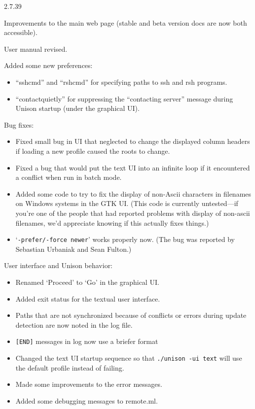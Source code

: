 \begin{changesfromversion}{2.7.39}
\item Improvements to the main web page (stable and beta version docs are
  now both accessible).
\item User manual revised.
\item Added some new preferences:
\begin{itemize}
\item ``sshcmd'' and ``rshcmd'' for specifying paths to ssh and rsh programs.
\item ``contactquietly'' for suppressing the ``contacting server'' message
during Unison startup (under the graphical UI).
\end{itemize}
\item Bug fixes:
\begin{itemize}
\item Fixed small bug in UI that neglected to change the displayed column
  headers if loading a new profile caused the roots to change.
\item Fixed a bug that would put the text UI into an infinite loop if it
  encountered a conflict when run in batch mode.
\item Added some code to try to fix the display of non-Ascii characters in
  filenames on Windows systems in the GTK UI.  (This code is currently
  untested---if you're one of the people that had reported problems with
  display of non-ascii filenames, we'd appreciate knowing if this actually
  fixes things.)
\item `\verb|-prefer/-force newer|' works properly now.
        (The bug was reported by Sebastian Urbaniak and Sean Fulton.)
\end{itemize}
\item User interface and Unison behavior:
\begin{itemize}
\item Renamed `Proceed' to `Go' in the graphical UI.
\item Added exit status for the textual user interface.
\item Paths that are not synchronized because of conflicts or errors during
  update detection are now noted in the log file.
\item \verb|[END]| messages in log now use a briefer format
\item Changed the text UI startup sequence so that
  {\tt ./unison -ui text} will use the default profile instead of failing.
\item Made some improvements to the error messages.
\item Added some debugging messages to remote.ml.
\end{itemize}
\end{changesfromversion}

